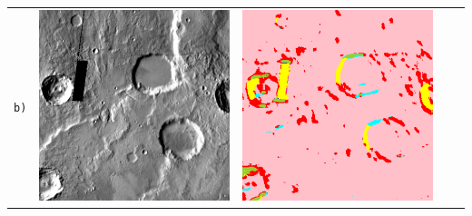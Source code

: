 \begin{table}[h!]
\begin{tabularx}{\textwidth}{>{\centering}m{}
			>{\centering}m{}
			>{\centering}m{}
			>{\centering}m{}
			>{\centering\arraybackslash}m{}}
		\texttt{b)} &
		\includegraphics[width=0.9\linewidth]{images/gen/results_robbins/input/thm_dir_N-30_210.png_sourcetile_100.png} &
		\includegraphics[width=0.9\linewidth]{images/gen/results_robbins/result/thm_dir_N-30_210.png_tile_100.png} &

\end{tabularx}
\end{table}
